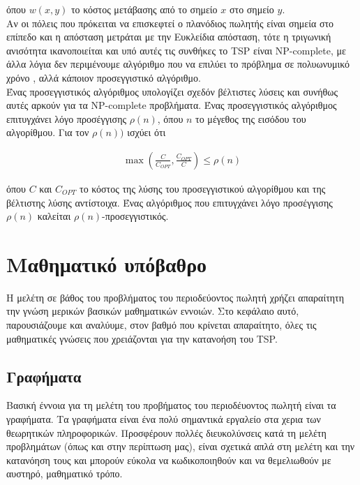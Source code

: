 \documentclass[oneside,12pt]{book}
\theoremstyle{definition}
\begin{document}
όπου \(w(x,y)\) το κόστος μετάβασης από το σημείο \(x\) στο σημείο \(y\). \\

Αν οι πόλεις που πρόκειται να επισκεφτεί ο πλανόδιος πωλητής είναι σημεία στο επίπεδο και η απόσταση μετράται με την Ευκλείδια απόσταση, τότε η τριγωνική ανισότητα ικανοποιείται και υπό αυτές τις συνθήκες το TSP είναι NP-complete, με άλλα λόγια δεν περιμένουμε αλγόριθμο που να επιλύει το πρόβλημα σε πολυωνυμικό χρόνο , αλλά κάποιον προσεγγιστικό αλγόριθμο. \\

Ένας προσεγγιστικός αλγόριθμος υπολογίζει σχεδόν βέλτιστες λύσεις και συνήθως αυτές αρκούν για τα NP-complete προβλήματα. Ένας προσεγγιστικός αλγόριθμος επιτυγχάνει λόγο προσέγγισης \(ρ(n)\), όπου \(n\) το μέγεθος της εισόδου του αλγορίθμου. Για τον \(ρ(n))\) ισχύει ότι

\begin{align*}
	\max\left(\frac{C}{C_{OPT}}, \frac{C_{OPT}}{C}\right) \leq ρ(n)
\end{align*}  

όπου \(C\) και \(C_{OPT}\) το κόστος της λύσης του προσεγγιστικού αλγορίθμου και της βέλτιστης λύσης αντίστοιχα. Ένας αλγόριθμος που επιτυγχάνει λόγο προσέγγισης \(ρ(n)\) καλείται \(ρ(n)\)-προσεγγιστικός. \\

\chapter{Μαθηματικό υπόβαθρο}

Η μελέτη σε βάθος του προβλήματος του περιοδεύοντος πωλητή χρήζει απαραίτητη την γνώση μερικών βασικών μαθηματικών εννοιών. Στο κεφάλαιο αυτό, παρουσιάζουμε και αναλύυμε, στον βαθμό που κρίνεται απαραίτητο, όλες τις μαθηματικές γνώσεις που χρειάζονται για την κατανοήση του TSP. \\

\section{Γραφήματα}

Βασική έννοια για τη μελέτη του προβήματος του περιοδέυοντος πωλητή είναι τα γραφήματα. Τα γραφήματα είναι ένα πολύ σημαντικά εργαλείο στα χερια των θεωρητικών πληροφορικών. Προσφέρουν πολλές διευκολύνσεις κατά τη μελέτη προβλημάτων (όπως και στην περίπτωση μας), είναι σχετικά απλά στη μελέτη και την κατανόηση τους και μπορούν εύκολα να κωδικοποιηθούν και να θεμελιωθούν με αυστηρό, μαθηματικό τρόπο. \\
\end{document}
